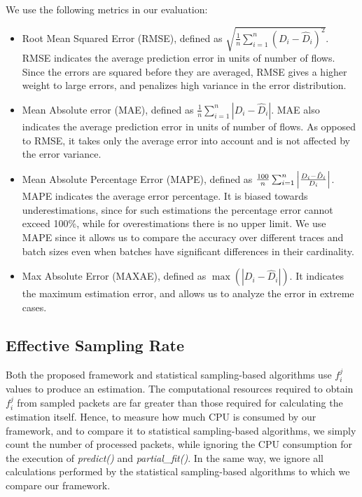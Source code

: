 		We use the following metrics in our evaluation:
		\begin{itemize}
			\item Root Mean Squared Error (RMSE), defined as $\sqrt{\frac{1}{n} \sum_{i=1}^{n} \left( D_i-\hat{D}_i \right) ^ 2}$. RMSE indicates the average prediction error in units of number of flows. Since the errors are squared before they are averaged, RMSE gives a higher weight to large errors, and penalizes high variance in the error distribution.
			
			\item Mean Absolute error (MAE), defined as $\frac{1}{n} \sum_{i=1}^{n}|D_i-\hat{D}_i|$. MAE also indicates the average prediction error in units of number of flows. As opposed to RMSE, it takes only the average error into account and is not affected by the error variance.
			
			\item Mean Absolute Percentage Error (MAPE), defined as $\frac{100}{n}\sum_{i=1}^{n}\left\vert \frac{D_i-\hat{D}_i}{D_i} \right\vert$. MAPE indicates the average error percentage. It is biased towards underestimations, since for such estimations the percentage error cannot exceed 100\%, while for overestimations there is no upper limit. We use MAPE since it allows us to compare the accuracy over different traces and batch sizes even when batches have significant differences in their cardinality.
			
			\item Max Absolute Error (MAXAE), defined as $\max(|D_i-\hat{D}_i|)$. It indicates the maximum estimation error, and allows us to analyze the error in extreme cases.
			
		\end{itemize}

	\subsection{Effective Sampling Rate} \label{subsec:effective}

		Both the proposed framework and statistical sampling-based algorithms use $f^j_i$ values to produce an estimation. The computational resources required to obtain $f^j_i$ from sampled packets are far greater than those required for calculating the estimation itself. Hence, to measure how much CPU is consumed by our framework, and to compare it to statistical sampling-based algorithms, we simply count the number of processed packets, while ignoring the CPU consumption for the execution of \emph{predict()} and \emph{partial\_fit()}. In the same way, we ignore all calculations performed by the statistical sampling-based algorithms to which we compare our framework. 
		
